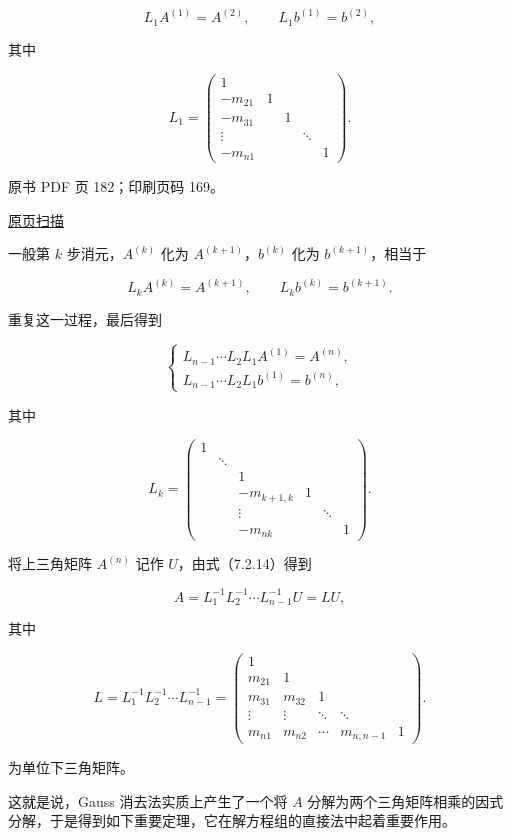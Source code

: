 \[L_1A^{(1)}=A^{(2)},\qquad L_1b^{(1)}=b^{(2)},\]

其中

\[
L_1=\begin{pmatrix}
1&&&&\\
-m_{21}&1&&&\\
-m_{31}&&1&&\\
\vdots&&&\ddots&\\
-m_{n1}&&&&1
\end{pmatrix}.
\]

\clearpage

原书 PDF 页 182；印刷页码 169。

\href{source-images/pdf-182.jpeg}{原页扫描}

一般第 \(k\) 步消元，\(A^{(k)}\) 化为 \(A^{(k+1)}\)，\(b^{(k)}\) 化为 \(b^{(k+1)}\)，相当于

\[L_kA^{(k)}=A^{(k+1)},\qquad L_kb^{(k)}=b^{(k+1)}.\]

重复这一过程，最后得到

\[
\begin{cases}
L_{n-1}\cdots L_2L_1A^{(1)}=A^{(n)},\\
L_{n-1}\cdots L_2L_1b^{(1)}=b^{(n)},
\end{cases}
\tag{7.2.14}
\]

其中

\[
L_k=\begin{pmatrix}
1&&&&&\\
&\ddots&&&&\\
&&1&&&\\
&&-m_{k+1,k}&1&&\\
&&\vdots&&\ddots&\\
&&-m_{nk}&&&1
\end{pmatrix}.
\]

将上三角矩阵 \(A^{(n)}\) 记作 \(U\)，由式（7.2.14）得到

\[A=L_1^{-1}L_2^{-1}\cdots L_{n-1}^{-1}U=LU,\]

其中

\[
L=L_1^{-1}L_2^{-1}\cdots L_{n-1}^{-1}
=\begin{pmatrix}
1&&&&\\
m_{21}&1&&&\\
m_{31}&m_{32}&1&&\\
\vdots&\vdots&\ddots&\ddots&\\
m_{n1}&m_{n2}&\cdots&m_{n,n-1}&1
\end{pmatrix}.
\]

为单位下三角矩阵。

这就是说，Gauss 消去法实质上产生了一个将 \(A\) 分解为两个三角矩阵相乘的因式分解，于是得到如下重要定理，它在解方程组的直接法中起着重要作用。

